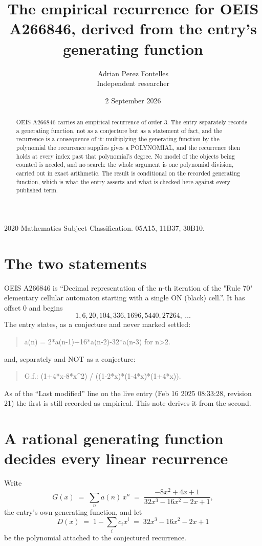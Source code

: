 \documentclass[11pt,a4paper]{article}
\title{The empirical recurrence for OEIS A266846, derived from the entry's generating function}
\author{Adrian Perez Fontelles\\ \small Independent researcher}
\date{2 September 2026}
\theoremstyle{plain}
\theoremstyle{definition}
\begin{document}
\maketitle

\begin{abstract}
OEIS A266846 carries an empirical recurrence of order $3$. The entry separately records a
generating function, not as a conjecture but as a statement of fact, and the recurrence is a
consequence of it: multiplying the generating function by the polynomial the recurrence
supplies gives a POLYNOMIAL, and the recurrence then holds at every index past that
polynomial's degree. No model of the objects being counted is needed, and no search: the
whole argument is one polynomial division, carried out in exact arithmetic. The result is
conditional on the recorded generating function, which is what the entry asserts and what is
checked here against every published term.
\end{abstract}

\noindent\small 2020 Mathematics Subject Classification. 05A15, 11B37, 30B10.\normalsize

\section{The two statements}

OEIS A266846 is ``Decimal representation of the n-th iteration of the "Rule 70" elementary cellular automaton starting with a single ON (black) cell.''. It has offset $0$ and begins
\[
1, 6, 20, 104, 336, 1696, 5440, 27264,\ \dots
\]
The entry states, as a conjecture and never marked settled:
\begin{quote}
a(n) = 2*a(n-1)+16*a(n-2)-32*a(n-3) for n>2.
\end{quote}
and, separately and NOT as a conjecture:
\begin{quote}
G.f.: (1+4*x-8*x\^{}2) / ((1-2*x)*(1-4*x)*(1+4*x)).
\end{quote}
As of the ``Last modified'' line on the live entry (Feb 16 2025 08:33:28, revision 21) the first is still
recorded as empirical. This note derives it from the second.

\section{A rational generating function decides every linear recurrence}

Write
\[
G(x)\;=\;\sum_{n}a(n)\,x^{n}\;=\;\frac{- 8 x^{2} + 4 x + 1}{32 x^{3} - 16 x^{2} - 2 x + 1},
\]
the entry's own generating function, and let
\[
D(x)\;=\;1-\sum_i c_i x^{i}\;=\;32 x^{3} - 16 x^{2} - 2 x + 1
\]
be the polynomial attached to the conjectured recurrence.
\end{document}
